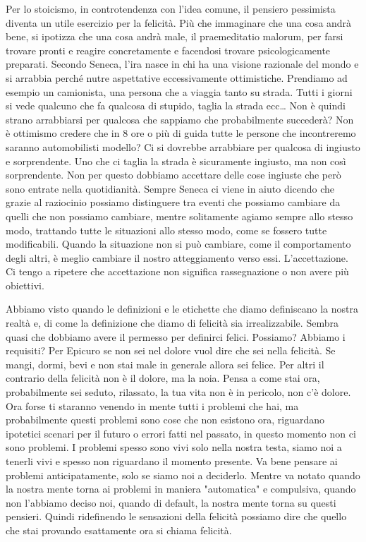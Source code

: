 \documentclass[12pt]{book} %
\begin{document}
Per lo stoicismo, in controtendenza con l'idea comune, il pensiero pessimista diventa un utile
esercizio per la felicità. Più che immaginare che una cosa andrà bene, si ipotizza che una cosa andrà male, il praemeditatio malorum, per farsi
trovare pronti e reagire concretamente e facendosi trovare psicologicamente preparati. Secondo Seneca, l'ira nasce in chi ha una visione razionale del mondo e si arrabbia perché nutre aspettative eccessivamente ottimistiche. Prendiamo ad esempio un
camionista, una persona che a viaggia tanto su strada. Tutti i giorni si vede qualcuno che fa qualcosa di stupido,
taglia la strada ecc… Non è quindi strano arrabbiarsi per qualcosa che sappiamo che probabilmente succederà? Non è
ottimismo credere che in 8 ore o più di guida tutte le persone che incontreremo saranno automobilisti modello? Ci si dovrebbe
arrabbiare per qualcosa di ingiusto e sorprendente. Uno che ci taglia la strada è sicuramente ingiusto, ma non così
sorprendente. Non per questo dobbiamo accettare delle cose ingiuste che però sono entrate nella quotidianità. Sempre
Seneca ci viene in aiuto dicendo che grazie al raziocinio possiamo distinguere tra eventi che possiamo cambiare da
quelli che non possiamo cambiare, mentre solitamente agiamo sempre allo stesso modo, trattando tutte le situazioni allo
stesso modo, come se fossero tutte modificabili. Quando la situazione non si può cambiare, come il comportamento degli
altri, è meglio cambiare il nostro atteggiamento verso essi. L'accettazione. Ci
tengo a ripetere che accettazione non significa rassegnazione o non avere più obiettivi.

Abbiamo visto quando le definizioni e le etichette che diamo definiscano la nostra realtà e, di come la definizione che
diamo di felicità sia irrealizzabile. Sembra quasi che dobbiamo avere il permesso per definirci felici. Possiamo?
Abbiamo i requisiti? Per Epicuro se non sei nel dolore vuol dire che sei nella felicità. Se mangi, dormi, bevi e non
stai male in generale allora sei felice. Per altri il contrario della felicità non è il dolore, ma la noia. Pensa a
come stai ora, probabilmente sei seduto, rilassato, la tua vita non è in pericolo, non c'è dolore.
Ora forse ti staranno venendo in mente tutti i problemi che hai, ma probabilmente questi problemi sono cose che non
esistono ora, riguardano ipotetici scenari per il futuro o errori fatti nel passato, in questo momento non ci sono
problemi. I problemi spesso sono vivi solo nella nostra testa, siamo noi a tenerli vivi e spesso non riguardano il
momento presente. Va bene pensare ai problemi anticipatamente, solo se siamo noi a deciderlo. Mentre va notato quando la nostra mente torna ai problemi in maniera "automatica" e compulsiva, quando non l'abbiamo deciso noi, quando di default, la nostra mente torna su questi pensieri.
Quindi ridefinendo le sensazioni della felicità possiamo dire che quello che stai provando esattamente ora si chiama felicità. 
\end{document}
